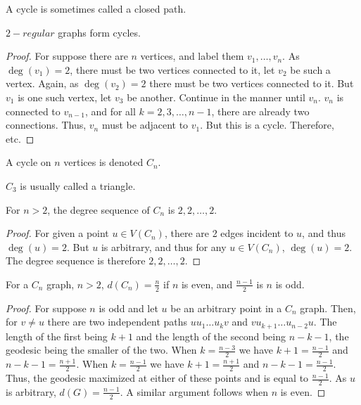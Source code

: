 \documentclass[crop=false,class=book]{standalone}
\begin{document}
\begin{remark}
A cycle is sometimes called a closed path.
\end{remark}
\begin{corollary}
$2-regular$ graphs form cycles.
\end{corollary}
\begin{proof}
For suppose there are $n$ vertices, and label them $v_1,\hdots, v_n$. As $\deg(v_1)=2$, there must be two vertices connected to it, let $v_2$ be such a vertex. Again, as $\deg(v_2)=2$ there must be two vertices connected to it. But $v_1$ is one such vertex, let $v_3$ be another. Continue in the manner until $v_n$. $v_n$ is connected to $v_{n-1}$, and for all $k=2,3,\hdots, n-1$, there are already two connections. Thus, $v_n$ must be adjacent to $v_1$. But this is a cycle. Therefore, etc.
\end{proof}
\begin{definition}
A cycle on $n$ vertices is denoted $C_n$.
\end{definition}
\begin{remark}
$C_3$ is usually called a triangle.
\end{remark}
\begin{corollary}
For $n>2$, the degree sequence of $C_n$ is $2,2,\hdots, 2$.
\end{corollary}
\begin{proof}
For given a point $u\in V(C_n)$, there are 2 edges incident to $u$, and thus $\deg(u) = 2$. But $u$ is arbitrary, and thus for any $u\in V(C_n)$, $\deg(u) = 2$. The degree sequence is therefore $2,2,\hdots, 2$.
\end{proof}
\begin{theorem}
For a $C_n$ graph, $n>2$, $d(C_n) = \frac{n}{2}$ if $n$ is even, and $\frac{n-1}{2}$ is $n$ is odd.
\end{theorem}
\begin{proof}
For suppose $n$ is odd and let $u$ be an arbitrary point in a $C_n$ graph. Then, for $v\ne u$ there are two independent paths $uu_1\hdots u_k v$ and $vu_{k+1}\hdots u_{n-2}u$. The length of the first being $k+1$ and the length of the second being $n-k-1$, the geodesic being the smaller of the two. When $k= \frac{n-3}{2}$ we have $k+1 = \frac{n-1}{2}$ and $n-k-1 = \frac{n+1}{2}$. When $k=\frac{n-1}{2}$ we have $k+1 = \frac{n+1}{2}$ and $n-k-1 = \frac{n-1}{2}$. Thus, the geodesic maximized at either of these points and is equal to $\frac{n-1}{2}$. As $u$ is arbitrary, $d(G) = \frac{n-1}{2}$. A similar argument follows when $n$ is even.
\end{proof}
\end{document}
